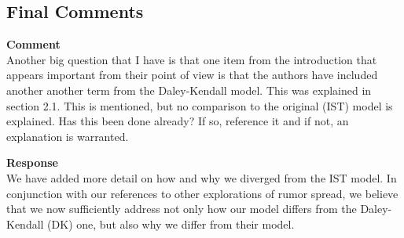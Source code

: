 \subsection{Final Comments}

\textbf{Comment} \\
Another big question that I have is that one item from the introduction that appears important from their point of view is that the authors have included another another term from the Daley-Kendall model.
This was explained in section 2.1.
This is mentioned, but no comparison to the original (IST) model is explained. Has this been done already?
If so, reference it and if not, an explanation is warranted.

\textbf{Response} \\
We have added more detail on how and why we diverged from the IST model.
In conjunction with our references to other explorations of rumor spread, we believe that we now sufficiently address not only how our model differs from the Daley-Kendall (DK) one, but also why we differ from their model.
